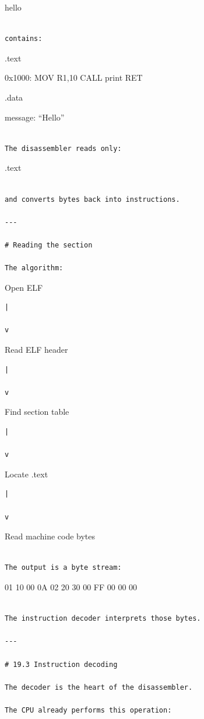 \documentclass[
  oneside,
  openany]{book}
\begin{document}
hello

\begin{verbatim}

contains:
\end{verbatim}

.text

0x1000: MOV R1,10 CALL print RET

.data

message: ``Hello''

\begin{verbatim}

The disassembler reads only:
\end{verbatim}

.text

\begin{verbatim}

and converts bytes back into instructions.

---

# Reading the section

The algorithm:
\end{verbatim}

Open ELF

\begin{verbatim}
|

v
\end{verbatim}

Read ELF header

\begin{verbatim}
|

v
\end{verbatim}

Find section table

\begin{verbatim}
|

v
\end{verbatim}

Locate .text

\begin{verbatim}
|

v
\end{verbatim}

Read machine code bytes

\begin{verbatim}

The output is a byte stream:
\end{verbatim}

01 10 00 0A 02 20 30 00 FF 00 00 00

\begin{verbatim}

The instruction decoder interprets those bytes.

---

# 19.3 Instruction decoding

The decoder is the heart of the disassembler.

The CPU already performs this operation:
\end{verbatim}
\end{document}

